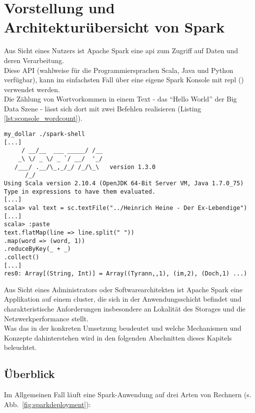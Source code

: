 \chapter{Vorstellung und Architekturübersicht von Spark}
Aus Sicht eines Nutzers ist Apache Spark eine \gls{api} zum Zugriff auf Daten und deren Verarbeitung.\\

Diese API (wahlweise für die Programmiersprachen Scala, Java und Python verfügbar), kann im einfachsten Fall über eine eigene Spark Konsole mit \gls{repl} (\cite{Hail}) verwendet werden.\\
Die Zählung von Wortvorkommen in einem Text - das "`Hello World"' der Big Data Szene - lässt sich dort mit zwei Befehlen realisieren (Listing \ref{lst:sconsole_wordcount}).\\

\begin{lstlisting}[caption={Word Count in der Spark Konsole},label={lst:sconsole_wordcount}]
my_dollar ./spark-shell
[...]
     / __/__  ___ _____/ /__
    _\ \/ _ \/ _ `/ __/  '_/
   /___/ .__/\_,_/_/ /_/\_\   version 1.3.0
      /_/
Using Scala version 2.10.4 (OpenJDK 64-Bit Server VM, Java 1.7.0_75)
Type in expressions to have them evaluated.
[...]
scala> val text = sc.textFile("../Heinrich Heine - Der Ex-Lebendige")
[...]
scala> :paste
text.flatMap(line => line.split(" "))
.map(word => (word, 1))
.reduceByKey(_ + _)
.collect()
[...]
res0: Array[(String, Int)] = Array((Tyrann,,1), (im,2), (Doch,1) ...)
\end{lstlisting}


Aus Sicht eines Administrators oder Softwarearchitekten ist Apache Spark eine Applikation auf einem \gls{cluster}, die sich in der Anwendungsschicht befindet und charakteristische Anforderungen insbesondere an Lokalität des Storages und die Netzwerkperformance stellt.\\

Was das in der konkreten Umsetzung beudeutet und welche Mechanismen und Konzepte dahinterstehen wird in den folgenden Abschnitten dieses Kapitels beleuchtet.

\section{Überblick}
Im Allgemeinen Fall läuft eine Spark-Anwendung auf drei Arten von Rechnern (s. Abb.~\ref{fig:sparkdeployment}):

